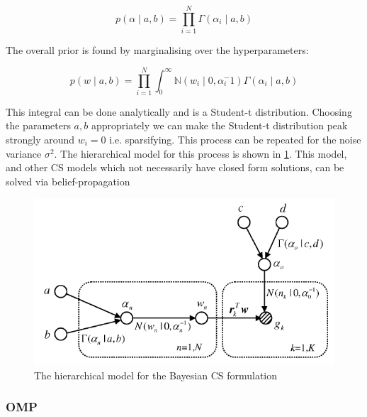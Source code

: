 \documentclass[conference]{IEEEtran}
\begin{document}
\begin{equation}
p\left(\alpha \mid a, b \right) = \prod_{i=1}^{N} \Gamma\left( \alpha_i \mid a, b \right)
\end{equation}

The overall prior is found by marginalising over the hyperparameters:

\begin{equation}
p\left( w \mid a, b \right) = \prod_{i=1}^{N} \int_{0}^{\infty} \mathbb{N}\left(w_i\mid 0, \alpha_{i}^-1\right) \Gamma\left( \alpha_i \mid a, b \right)
\end{equation}

This integral can be done analytically and is a Student-t distribution. Choosing the parameters \(a,b\) appropriately we can make the Student-t distribution peak strongly around \(w_i = 0\) i.e. sparsifying. This process can be repeated for the noise variance \(\sigma^2\). The hierarchical model for this process is shown in \ref{bayesiancs}. This model, and other CS models which not necessarily have closed form solutions, can be solved via belief-propagation \cite{Baron2010}

\begin{figure}[h]
\centering
\includegraphics[height = 7 cm]{bayesiancs.png}
\caption{The hierarchical model for the Bayesian CS formulation \cite{Ji2008}}
\label{bayesiancs}
\end{figure}

\subsubsection*{OMP}
\end{document}
